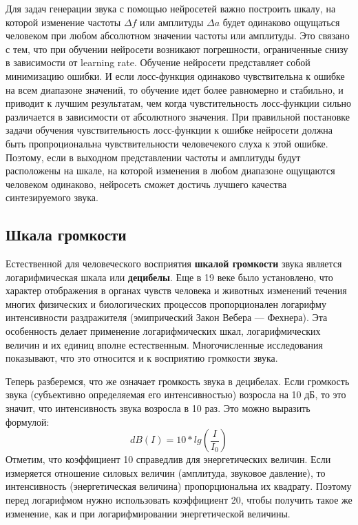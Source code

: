 Для задач генерации звука с помощью нейросетей важно построить шкалу, 
на которой изменение частоты $\Delta f$ или амплитуды $\Delta a$ будет одинаково ощущаться человеком при любом абсолютном значении частоты или амплитуды.
Это связано с тем, что при обучении нейросети возникают погрешности, ограниченные снизу в зависимости от learning rate. 
Обучение нейросети представляет собой минимизацию ошибки. 
И если лосс-функция одинаково чувствительна к ошибке на всем диапазоне значений, то обучение идет более равномерно и стабильно, и приводит к лучшим результатам,
чем когда чувстительность лосс-функции сильно различается в зависимости от абсолютного значения.
При правильной постановке задачи обучения чувствительность лосс-функции к ошибке нейросети должна быть пропроциональна чувствительности человечекого слуха к этой ошибке. 
Поэтому, если в выходном представлении частоты и амплитуды будут расположены на шкале, на которой изменения в любом диапазоне ощущаются человеком одинаково, 
нейросеть сможет достичь лучшего качества синтезируемого звука.


\subsection{Шкала громкости}

Естественной для человеческого восприятия \textbf{шкалой громкости} звука является логарифмическая шкала или \textbf{децибелы}.
Еще в 19 веке было установлено, что характер отображения в органах чувств человека и животных изменений течения многих физических и 
биологических процессов пропорционален логарифму интенсивности раздражителя (эмипрический Закон Вебера — Фехнера).
Эта особенность делает применение логарифмических шкал, логарифмических величин и их единиц вполне естественным.
Многочисленные исследования показывают, что это относится и к восприятию громкости звука.

Теперь разберемся, что же означает громкость звука в децибелах. 
Если громкость звука (субъективно определяемая его интенсивностью) возросла на 10 дБ, то это значит, что интенсивность звука возросла в 10 раз.
Это можно выразить формулой:
\begin{equation}
  dB(I) = 10 * lg(\frac{I}{I_0})
\end{equation}
Отметим, что коэффициент 10 справедлив для энергетических величин. 
Если измеряется отношение силовых величин (амплитуда, звуковое давление), то интенсивность (энергетическая величина) пропорциональна их квадрату. 
Поэтому перед логарифмом нужно использовать коэффициент 20, чтобы получить такое же изменение, как и при логарифмировании энергетической величины.

